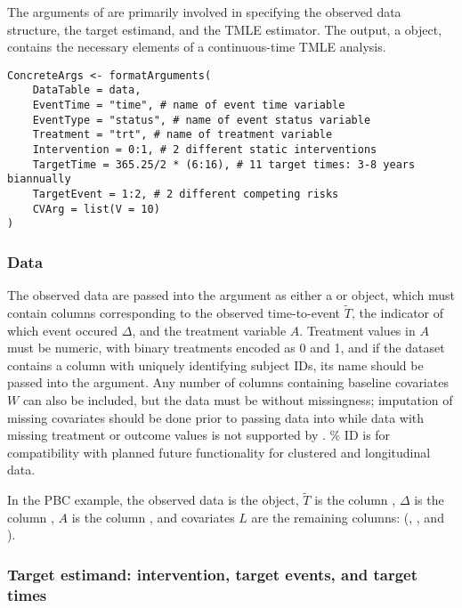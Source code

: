 The arguments of  are primarily involved in specifying the observed data structure, the target estimand, and the TMLE estimator. The output, a  object, contains the necessary elements of a continuous-time TMLE analysis.

\begin{verbatim}
ConcreteArgs <- formatArguments(
    DataTable = data,
    EventTime = "time", # name of event time variable
    EventType = "status", # name of event status variable
    Treatment = "trt", # name of treatment variable
    Intervention = 0:1, # 2 different static interventions
    TargetTime = 365.25/2 * (6:16), # 11 target times: 3-8 years biannually
    TargetEvent = 1:2, # 2 different competing risks
    CVArg = list(V = 10)
)
\end{verbatim}

\hypertarget{sec-obs-data}{%
\subsubsection{Data}\label{sec-obs-data}}

The observed data are passed into the  argument as either a  or  object, which must contain columns corresponding to the observed time-to-event \(\widetilde T\), the indicator of which event occured \(\Delta\), and the treatment variable \(A\). Treatment values in \(A\) must be numeric, with binary treatments encoded as 0 and 1, and if the dataset contains a column with uniquely identifying subject IDs, its name should be passed into the  argument. Any number of columns containing baseline covariates \({W}\) can also be included, but the data must be without missingness; imputation of missing covariates should be done prior to passing data into  while data with missing treatment or outcome values is not supported by . \% ID is for compatibility with planned future functionality for clustered and longitudinal data.

In the PBC example, the observed data is the  object, \(\widetilde T\) is the column , \(\Delta\) is the column , \(A\) is the column , and covariates \(L\) are the remaining columns: (, , and ).

\hypertarget{sec-estimand}{%
\subsubsection{Target estimand: intervention, target events, and target times}\label{sec-estimand}}

